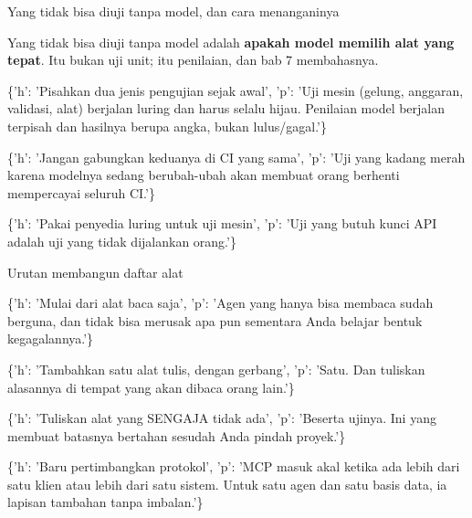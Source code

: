 \documentclass[aspectratio=169,11pt,t]{beamer}
\begin{document}
\begin{frame}[shrink=25]{Yang tidak bisa diuji tanpa model, dan cara menanganinya}
{\fontsize{9.4}{12.6}\selectfont\color{fg2}Yang tidak bisa diuji tanpa model adalah \textbf{apakah model memilih alat yang tepat}. Itu bukan uji unit; itu penilaian, dan bab 7 membahasnya.\par}\vskip 4pt
\begin{isteps}
\item \{'h': 'Pisahkan dua jenis pengujian sejak awal', 'p': 'Uji mesin (gelung, anggaran, validasi, alat) berjalan luring dan harus selalu hijau. Penilaian model berjalan terpisah dan hasilnya berupa angka, bukan lulus/gagal.'\}
\item \{'h': 'Jangan gabungkan keduanya di CI yang sama', 'p': 'Uji yang kadang merah karena modelnya sedang berubah-ubah akan membuat orang berhenti mempercayai seluruh CI.'\}
\item \{'h': 'Pakai penyedia luring untuk uji mesin', 'p': 'Uji yang butuh kunci API adalah uji yang tidak dijalankan orang.'\}
\end{isteps}
\end{frame}


\begin{frame}[shrink=25]{Urutan membangun daftar alat}
\begin{isteps}
\item \{'h': 'Mulai dari alat baca saja', 'p': 'Agen yang hanya bisa membaca sudah berguna, dan tidak bisa merusak apa pun sementara Anda belajar bentuk kegagalannya.'\}
\item \{'h': 'Tambahkan satu alat tulis, dengan gerbang', 'p': 'Satu. Dan tuliskan alasannya di tempat yang akan dibaca orang lain.'\}
\item \{'h': 'Tuliskan alat yang SENGAJA tidak ada', 'p': 'Beserta ujinya. Ini yang membuat batasnya bertahan sesudah Anda pindah proyek.'\}
\item \{'h': 'Baru pertimbangkan protokol', 'p': 'MCP masuk akal ketika ada lebih dari satu klien atau lebih dari satu sistem. Untuk satu agen dan satu basis data, ia lapisan tambahan tanpa imbalan.'\}
\end{isteps}
\end{frame}
\end{document}
